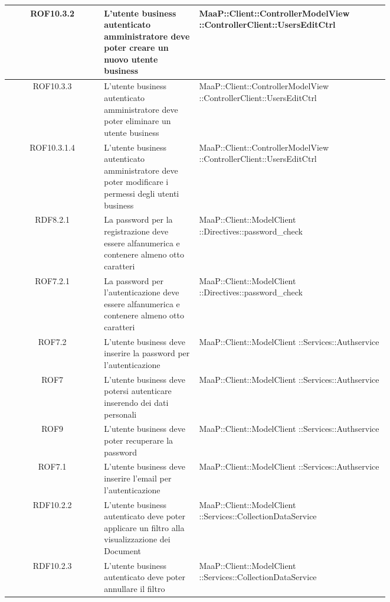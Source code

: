 \begin{center}
\begin{longtable}{|c|p{0.25\linewidth}|p{0.5\linewidth}|}
\midrule
ROF10.3.2
& L'utente business autenticato amministratore deve poter creare un nuovo utente business
& MaaP::Client::ControllerModelView ::ControllerClient::UsersEditCtrl\\

\midrule
ROF10.3.3
& L'utente business autenticato amministratore deve poter eliminare un utente business
& MaaP::Client::ControllerModelView ::ControllerClient::UsersEditCtrl\\

\midrule
ROF10.3.1.4
& L'utente business autenticato amministratore deve poter modificare i permessi degli utenti business
& MaaP::Client::ControllerModelView ::ControllerClient::UsersEditCtrl\\

\midrule
RDF8.2.1
& La password per la registrazione deve essere alfanumerica e contenere almeno otto caratteri
& MaaP::Client::ModelClient ::Directives::password\_check\\

\midrule
ROF7.2.1
& La password per l'autenticazione deve essere alfanumerica e contenere almeno otto caratteri
& MaaP::Client::ModelClient ::Directives::password\_check\\

\midrule
ROF7.2
& L'utente business deve inserire la password per l'autenticazione
& MaaP::Client::ModelClient ::Services::Authservice\\

\midrule
ROF7
& L'utente business deve potersi autenticare inserendo dei dati personali
& MaaP::Client::ModelClient ::Services::Authservice\\

\midrule
ROF9
& L'utente business deve poter recuperare la password
& MaaP::Client::ModelClient ::Services::Authservice\\

\midrule
ROF7.1
& L'utente business deve inserire l'email per l'autenticazione
& MaaP::Client::ModelClient ::Services::Authservice\\

\midrule
RDF10.2.2
& L'utente business autenticato deve poter applicare un filtro alla visualizzazione dei Document
& MaaP::Client::ModelClient ::Services::CollectionDataService\\

\midrule
RDF10.2.3
& L'utente business autenticato deve poter annullare il filtro
& MaaP::Client::ModelClient ::Services::CollectionDataService\\


\end{longtable}
\end{center}
